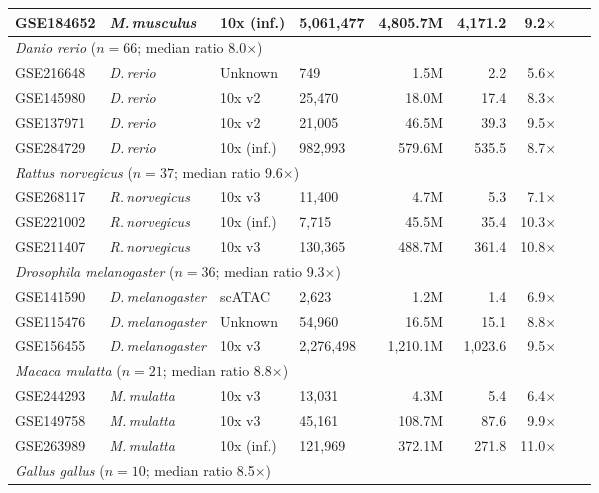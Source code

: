 \documentclass[10pt,twocolumn,letterpaper]{article}
\begin{document}
\begin{table}[h]
\begin{tabular}{llllrrrrr}
GSE184652  & \textit{M.\,musculus} & 10x (inf.)  & 5{,}061{,}477 & 4{,}805.7M & 4{,}171.2 &  9.2$\times$ \\
\midrule
\multicolumn{7}{l}{\textit{Danio rerio} ($n = 66$; median ratio 8.0$\times$)} \\
GSE216648  & \textit{D.\,rerio}    & Unknown     &      749 &    1.5M &    2.2 &  5.6$\times$ \\
GSE145980  & \textit{D.\,rerio}    & 10x v2      &   25{,}470 &   18.0M &   17.4 &  8.3$\times$ \\
GSE137971  & \textit{D.\,rerio}    & 10x v2      &   21{,}005 &   46.5M &   39.3 &  9.5$\times$ \\
GSE284729  & \textit{D.\,rerio}    & 10x (inf.)  &  982{,}993 &  579.6M &  535.5 &  8.7$\times$ \\
\midrule
\multicolumn{7}{l}{\textit{Rattus norvegicus} ($n = 37$; median ratio 9.6$\times$)} \\
GSE268117  & \textit{R.\,norvegicus} & 10x v3    &   11{,}400 &    4.7M &    5.3 &  7.1$\times$ \\
GSE221002  & \textit{R.\,norvegicus} & 10x (inf.) &    7{,}715 &   45.5M &   35.4 & 10.3$\times$ \\
GSE211407  & \textit{R.\,norvegicus} & 10x v3    &  130{,}365 &  488.7M &  361.4 & 10.8$\times$ \\
\midrule
\multicolumn{7}{l}{\textit{Drosophila melanogaster} ($n = 36$; median ratio 9.3$\times$)} \\
GSE141590  & \textit{D.\,melanogaster} & scATAC  &    2{,}623 &    1.2M &    1.4 &  6.9$\times$ \\
GSE115476  & \textit{D.\,melanogaster} & Unknown &   54{,}960 &   16.5M &   15.1 &  8.8$\times$ \\
GSE156455  & \textit{D.\,melanogaster} & 10x v3  & 2{,}276{,}498 & 1{,}210.1M & 1{,}023.6 &  9.5$\times$ \\
\midrule
\multicolumn{7}{l}{\textit{Macaca mulatta} ($n = 21$; median ratio 8.8$\times$)} \\
GSE244293  & \textit{M.\,mulatta}  & 10x v3      &   13{,}031 &    4.3M &    5.4 &  6.4$\times$ \\
GSE149758  & \textit{M.\,mulatta}  & 10x v3      &   45{,}161 &  108.7M &   87.6 &  9.9$\times$ \\
GSE263989  & \textit{M.\,mulatta}  & 10x (inf.)  &  121{,}969 &  372.1M &  271.8 & 11.0$\times$ \\
\midrule
\multicolumn{7}{l}{\textit{Gallus gallus} ($n = 10$; median ratio 8.5$\times$)} \\

\end{tabular}
\end{table}
\end{document}
